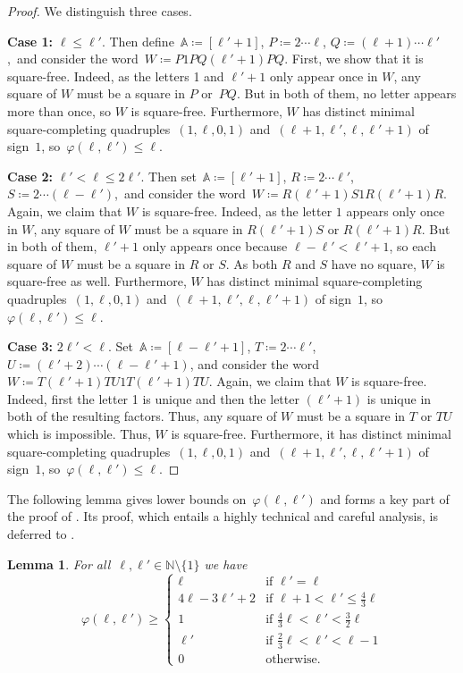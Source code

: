 \documentclass[12pt]{article}
\theoremstyle{plain}
\newtheorem{lemma}[theorem]{Lemma}
\theoremstyle{definition}
\newcommand\N{\mathbb{N}}
\newcommand{\coleq}{\coloneq}
\newcommand{\A}{\mathbb A}
\newcommand{\f}{\varphi}
\newcommand{\sm}{\setminus}
\begin{document}
	\begin{proof}
		We distinguish three cases. 
		
		\textbf{Case 1:} $\ell\le\ell'$. Then define~$\A\coleq[\ell'+1]$, $P \coleq 2\cdots\ell$, $Q \coleq (\ell+1)\cdots\ell'$,~and consider the word~$W\coleq P1PQ(\ell'+1)PQ$. First, we show that it is square-free. Indeed, as the letters 1 and $\ell'+1$ only appear once in $W$, any square of $W$ must be a square in $P$ or~$PQ$. But in both of them, no letter appears more than once, so $W$ is square-free. Furthermore, $W$ has distinct minimal square-completing quadruples~$(1,\ell,0,1)$ and~$(\ell+1,\ell',\ell,\ell'+1)$ of sign~$1$, so~$\f(\ell,\ell')\le\ell$. 
		
		\textbf{Case 2:} $\ell'<\ell\le2\ell'$. Then set~$\A\coleq [\ell'+1]$, $R \coleq 2\cdots\ell'$, $S \coleq 2\cdots(\ell-\ell')$,~and consider the word~$W\coleq R(\ell'+1)S1R(\ell'+1)R$. Again, we claim that $W$ is square-free. Indeed, as the letter $1$ appears only once in $W$, any square of $W$ must be a square in $R(\ell'+1)S$ or $R(\ell'+1)R$. But in both of them, $\ell'+1$ only appears once because $\ell-\ell'< \ell'+1$, so each square of $W$ must be a square in $R$ or $S$. As both $R$ and $S$ have no square, $W$ is square-free as well. Furthermore, $W$ has distinct minimal square-completing quadruples~$(1,\ell,0,1)$ and~$(\ell+1,\ell',\ell,\ell'+1)$ of sign~$1$, so~$\f(\ell,\ell')\le\ell$. 
		
		\textbf{Case 3:} $2\ell'<\ell$. Set~$\A\coleq[\ell-\ell'+1]$, $T \coleq 2\cdots\ell'$, $U \coleq (\ell'+2)\cdots(\ell-\ell'+1)$, and consider the word~$W\coleq T(\ell'+1)TU1T(\ell'+1)TU$. Again, we claim that $W$ is square-free. Indeed, first the letter 1 is unique and then the letter $(\ell'+1)$ is unique in both of the resulting factors. Thus, any square of $W$ must be a square in $T$ or $TU$ which is impossible. Thus, $W$ is square-free. Furthermore, it has distinct minimal square-completing quadruples~$(1,\ell,0,1)$ and~$(\ell+1,\ell',\ell,\ell'+1)$ of sign~$1$, so~$\f(\ell,\ell')\le\ell$.
	\end{proof}
	
	The following lemma gives lower bounds on~$\f(\ell,\ell')$ and forms a key part of the proof of . Its proof, which entails a highly technical and careful analysis, is deferred to .
	
	\begin{lemma} \label{lem:gap-lower-bound}
		For all~$\ell,\ell'\in\N\sm\{1\}$ we have
		\begin{equation*}
			\f(\ell,\ell') \ge
			\begin{cases}
				\ell &\textrm{if } \ell'=\ell \\
				4\ell-3\ell'+2 &\textrm{if } \ell+1<\ell'\le\frac{4}{3}\ell \\
				1 &\textrm{if } \frac{4}{3}\ell<\ell'<\frac{3}{2}\ell \\
				\ell' &\textrm{if } \frac{2}{3}\ell<\ell'<\ell-1 \\
				0 &\textrm{otherwise.}
			\end{cases}
		\end{equation*}
	\end{lemma}
	
\end{document}
